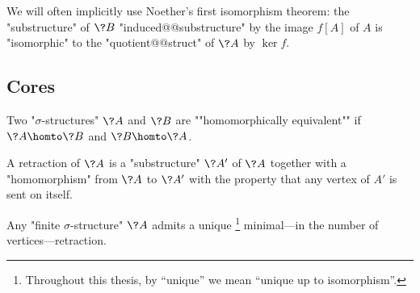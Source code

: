 We will often implicitly use Noether's first isomorphism theorem:
the "substructure" of $\?B$ "induced@@substructure" by the image $f[A]$
of $A$ is "isomorphic" to the "quotient@@struct" of $\?A$ by $\ker{f}$.

\subsection{Cores}

Two "$\sigma$-structures" $\?A$ and $\?B$ are ""homomorphically equivalent""
if $\?A \homto \?B$ and $\?B \homto \?A$.

A retraction of $\?A$ is a "substructure" $\?A'$ of $\?A$ together with
a "homomorphism" from $\?A$ to $\?A'$ with the property that any vertex of $A'$
is sent on itself.
\begin{proposition}
	Any "finite $\sigma$-structure" $\?A$ admits a unique%
	\footnote{Throughout this thesis, by ``unique'' we mean ``unique up to isomorphism''.}
	minimal---in the number of vertices---retraction.
\end{proposition}

